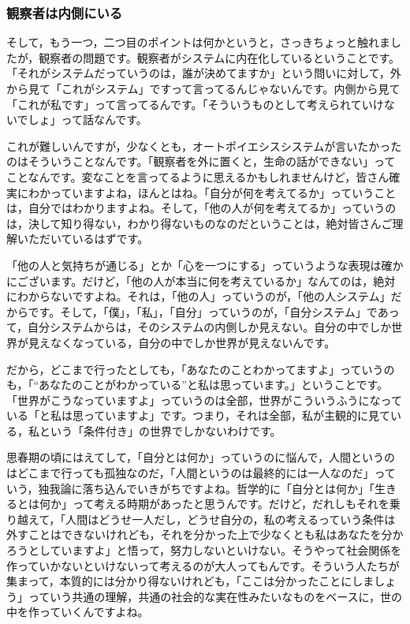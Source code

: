 \documentclass{ltjsbook}
\begin{document}
\subsubsection{観察者は内側にいる}

そして，もう一つ，二つ目のポイントは何かというと，さっきちょっと触れましたが，観察者の問題です。観察者がシステムに内在化しているということです。
「それがシステムだっていうのは，誰が決めてますか」という問いに対して，外から見て「これがシステム」ですって言ってるんじゃないんです。内側から見て「これが私です」って言ってるんです。「そういうものとして考えられていけないでしょ」って話なんです。

これが難しいんですが，少なくとも，オートポイエシスシステムが言いたかったのはそういうことなんです。「観察者を外に置くと，生命の話ができない」ってことなんです。変なことを言ってるように思えるかもしれませんけど，皆さん確実にわかっていますよね，ほんとはね。「自分が何を考えてるか」っていうことは，自分ではわかりますよね。そして，「他の人が何を考えてるか」っていうのは，決して知り得ない，わかり得ないものなのだということは，絶対皆さんご理解いただいているはずです。

「他の人と気持ちが通じる」とか「心を一つにする」っていうような表現は確かにございます。だけど，「他の人が本当に何を考えているか」なんてのは，絶対にわからないですよね。それは，「他の人」っていうのが，「他の人システム」だからです。そして，「僕」，「私」，「自分」っていうのが，「自分システム」であって，自分システムからは，そのシステムの内側しか見えない。自分の中でしか世界が見えなくなっている，自分の中でしか世界が見えないんです。

だから，どこまで行ったとしても，「あなたのことわかってますよ」っていうのも，「``あなたのことがわかっている''と私は思っています。」ということです。「世界がこうなっていますよ」っていうのは全部，世界がこういうふうになっている「と私は思っていますよ」です。つまり，それは全部，私が主観的に見ている，私という「条件付き」の世界でしかないわけです。

思春期の頃にはえてして，「自分とは何か」っていうのに悩んで，人間というのはどこまで行っても孤独なのだ，「人間というのは最終的には一人なのだ」っていう，独我論に落ち込んでいきがちですよね。哲学的に「自分とは何か」「生きるとは何か」って考える時期があったと思うんです。だけど，だれしもそれを乗り越えて，「人間はどうせ一人だし，どうせ自分の，私の考えるっていう条件は外すことはできないけれども，それを分かった上で少なくとも私はあなたを分かろうとしていますよ」と悟って，努力しないといけない。そうやって社会関係を作っていかないといけないって考えるのが大人ってもんです。そういう人たちが集まって，本質的には分かり得ないけれども，「ここは分かったことにしましょう」っていう共通の理解，共通の社会的な実在性みたいなものをベースに，世の中を作っていくんですよね。
\end{document}
